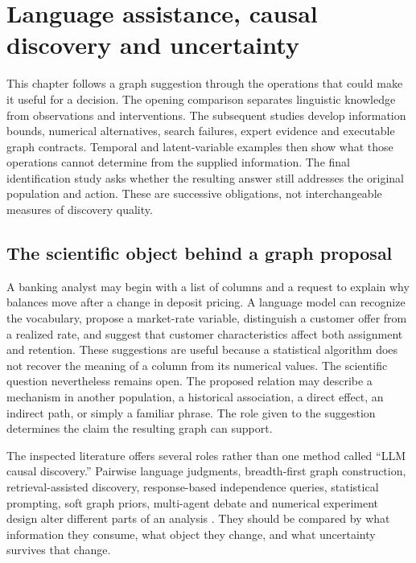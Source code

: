 \chapter{Language assistance, causal discovery and uncertainty}
\label{ch:la03-discovery}

This chapter follows a graph suggestion through the operations that could
make it useful for a decision. The opening comparison separates linguistic
knowledge from observations and interventions. The subsequent studies develop
information bounds, numerical alternatives, search failures, expert evidence
and executable graph contracts. Temporal and latent-variable examples then
show what those operations cannot determine from the supplied information.
The final identification study asks whether the resulting answer still
addresses the original population and action. These are successive obligations,
not interchangeable measures of discovery quality.

\section{The scientific object behind a graph proposal}

A banking analyst may begin with a list of columns and a request to explain why
balances move after a change in deposit pricing. A language model can recognize
the vocabulary, propose a market-rate variable, distinguish a customer offer
from a realized rate, and suggest that customer characteristics affect both
assignment and retention. These suggestions are useful because a statistical
algorithm does not recover the meaning of a column from its numerical values.
The scientific question nevertheless remains open. The proposed relation may
describe a mechanism in another population, a historical association, a direct
effect, an indirect path, or simply a familiar phrase. The role given to the
suggestion determines the claim the resulting graph can support.

The inspected literature offers several roles rather than one method called
``LLM causal discovery.'' Pairwise language judgments, breadth-first graph
construction, retrieval-assisted discovery, response-based independence
queries, statistical prompting, soft graph priors, multi-agent debate and
numerical experiment design alter different parts of an analysis
\citep{v12_la_2305_00050,v12_la_2402_01207,v12_la_2402_15301,
v12_la_2406_07378,v12_la_2402_01454,v12_la_2405_13551,
v12_la_2407_15073,v12_la_2608_09696}.
They should be compared by what information they consume, what object they
change, and what uncertainty survives that change.

